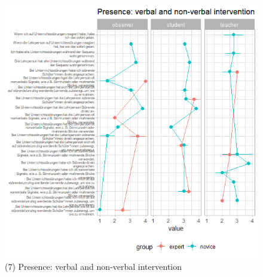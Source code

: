 \documentclass[
  english,
  man,floatsintext]{apa6}
\begin{document}
\begin{figure}

{\centering \includegraphics[width=5.33in]{./pictures/presenceverbalnonverbalintervention} 

}

\caption{(7) Presence: verbal and non-verbal intervention}\label{fig:presenceverbalnonverbalintervention}
\end{figure}
\newpage
\end{document}
